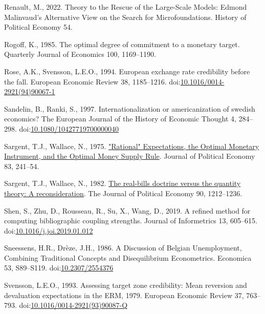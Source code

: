 \documentclass[
  12pt,
  onecolumn]{article}
\newlength{\cslhangindent}
\newlength{\cslentryspacingunit} %
\newenvironment{CSLReferences}[2] %
 {%
  \setlength{\parindent}{0pt}
  \ifodd #1
  \let\oldpar\par
  \def\par{\hangindent=\cslhangindent\oldpar}
  \fi
  \setlength{\parskip}{#2\cslentryspacingunit}
 }%
 {}
\begin{document}
\begin{CSLReferences}{1}{0}
\leavevmode{}%
Renault, M., 2022. Theory to the {Rescue} of the {Large-Scale Models}:
{Edmond Malinvaud}'s {Alternative View} on the {Search} for
{Microfoundations}. History of Political Economy 54.

\leavevmode{}%
Rogoff, K., 1985. The optimal degree of commitment to a monetary target.
Quarterly Journal of Economics 100, 1169--1190.

\leavevmode{}%
Rose, A.K., Svensson, L.E.O., 1994. European exchange rate credibility
before the fall. European Economic Review 38, 1185--1216.
doi:\href{https://doi.org/10.1016/0014-2921(94)90067-1}{10.1016/0014-2921(94)90067-1}

\leavevmode{}%
Sandelin, B., Ranki, S., 1997. Internationalization or americanization
of swedish economics? The European Journal of the History of Economic
Thought 4, 284--298.
doi:\href{https://doi.org/10.1080/10427719700000040}{10.1080/10427719700000040}

\leavevmode{}%
Sargent, T.J., Wallace, N., 1975.
\href{http://econpapers.repec.org/article/ucpjpolec/v_3A83_3Ay_3A1975_3Ai_3A2_3Ap_3A241-54.htm}{"{Rational}"
{Expectations}, the {Optimal} {Monetary} {Instrument}, and the {Optimal}
{Money} {Supply} {Rule}}. Journal of Political Economy 83, 241--54.

\leavevmode{}%
Sargent, T.J., Wallace, N., 1982.
\href{http://www.jstor.org/stable/1830945}{The real-bills doctrine
versus the quantity theory: {A} reconsideration}. The Journal of
Political Economy 90, 1212--1236.

\leavevmode{}%
Shen, S., Zhu, D., Rousseau, R., Su, X., Wang, D., 2019. A refined
method for computing bibliographic coupling strengths. Journal of
Informetrics 13, 605--615.
doi:\href{https://doi.org/10.1016/j.joi.2019.01.012}{10.1016/j.joi.2019.01.012}

\leavevmode{}%
Sneessens, H.R., Drèze, J.H., 1986. A {Discussion} of {Belgian
Unemployment}, {Combining Traditional Concepts} and {Disequilibrium
Econometrics}. Economica 53, S89--S119.
doi:\href{https://doi.org/10.2307/2554376}{10.2307/2554376}

\leavevmode{}%
Svensson, L.E.O., 1993. Assessing target zone credibility: {Mean}
reversion and devaluation expectations in the {ERM},
1979. European Economic Review 37, 763--793.
doi:\href{https://doi.org/10.1016/0014-2921(93)90087-Q}{10.1016/0014-2921(93)90087-Q}


\end{CSLReferences}
\end{document}
